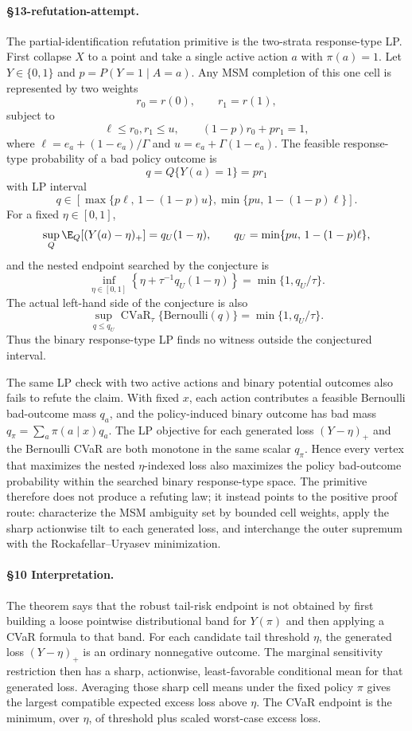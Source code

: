 \paragraph{\S13-refutation-attempt.}
The partial-identification refutation primitive is the two-strata response-type LP.  First collapse
\(X\) to a point and take a single active action \(a\) with \(\pi(a)=1\).  Let \(Y\in\{0,1\}\) and
\(p=P(Y=1\mid A=a)\).  Any MSM completion of this one cell is represented by two weights
\[
r_0=r(0),\qquad r_1=r(1),
\]
subject to
\[
\ell\le r_0,r_1\le u,\qquad (1-p)r_0+pr_1=1,
\]
where \(\ell=e_a+(1-e_a)/\Gamma\) and \(u=e_a+\Gamma(1-e_a)\).  The feasible response-type
probability of a bad policy outcome is
\[
q=Q\{Y(a)=1\}=pr_1
\]
with LP interval
\[
q\in
\left[
\max\{p\ell,\,1-(1-p)u\},
\min\{pu,\,1-(1-p)\ell\}
\right].
\]
For a fixed \(\eta\in[0,1]\),
\[
\sup_Q\E_Q[(Y(a)-\eta)_+]
=q_U(1-\eta),
\qquad
q_U=\min\{pu,\,1-(1-p)\ell\},
\]
and the nested endpoint searched by the conjecture is
\[
\inf_{\eta\in[0,1]}
\left\{\eta+\tau^{-1}q_U(1-\eta)\right\}
=\min\{1,q_U/\tau\}.
\]
The actual left-hand side of the conjecture is also
\[
\sup_{q\le q_U}\operatorname{CVaR}_{\tau}\{\mathrm{Bernoulli}(q)\}
=\min\{1,q_U/\tau\}.
\]
Thus the binary response-type LP finds no witness outside the conjectured interval.

The same LP check with two active actions and binary potential outcomes also fails to refute the
claim.  With fixed \(x\), each action contributes a feasible Bernoulli bad-outcome mass \(q_a\), and
the policy-induced binary outcome has bad mass \(q_\pi=\sum_a\pi(a\mid x)q_a\).  The LP objective
for each generated loss \((Y-\eta)_+\) and the Bernoulli CVaR are both monotone in the same scalar
\(q_\pi\).  Hence every vertex that maximizes the nested \(\eta\)-indexed loss also maximizes the
policy bad-outcome probability within the searched binary response-type space.  The primitive
therefore does not produce a refuting law; it instead points to the positive proof route: characterize
the MSM ambiguity set by bounded cell weights, apply the sharp actionwise tilt to each generated
loss, and interchange the outer supremum with the Rockafellar--Uryasev minimization.

\paragraph{\S10 Interpretation.}
The theorem says that the robust tail-risk endpoint is not obtained by first building a loose
pointwise distributional band for \(Y(\pi)\) and then applying a CVaR formula to that band.  For
each candidate tail threshold \(\eta\), the generated loss \((Y-\eta)_+\) is an ordinary nonnegative
outcome.  The marginal sensitivity restriction then has a sharp, actionwise, least-favorable
conditional mean for that generated loss.  Averaging those sharp cell means under the fixed policy
\(\pi\) gives the largest compatible expected excess loss above \(\eta\).  The CVaR endpoint is the
minimum, over \(\eta\), of threshold plus scaled worst-case excess loss.

